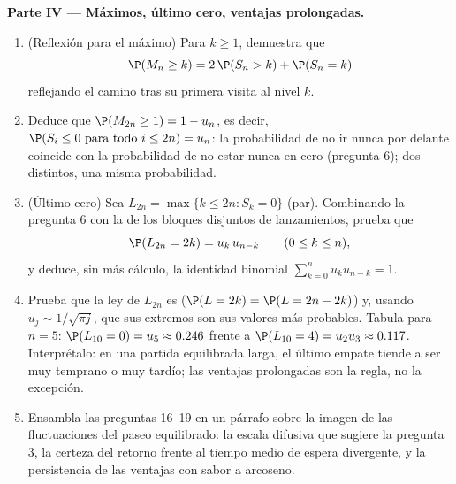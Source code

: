 \begin{problem}
\medskip
\noindent\textbf{Parte IV --- Máximos, último cero, ventajas
prolongadas.}
\begin{enumerate}[resume]
  \item (Reflexión para el máximo) Para $k \geq 1$, demuestra que
        \[
        \P(M_n \geq k) = 2\,\P(S_n > k) + \P(S_n = k)
        \]
        reflejando el camino tras su primera visita al nivel $k$.
  \item Deduce que $\P(M_{2n} \geq 1) = 1 - u_n$, es decir, $\P(S_i
        \leq 0 \text{ para todo } i \leq 2n) = u_n$: la probabilidad
        de no ir nunca por delante coincide con la probabilidad de
        no estar nunca en cero (pregunta 6); dos  distintos,
        una misma probabilidad.
  \item (Último cero) Sea $L_{2n} = \max\{k \leq 2n : S_k = 0\}$
        (par). Combinando la pregunta 6 con la  de los
        bloques disjuntos de lanzamientos, prueba que
        \[
        \P(L_{2n} = 2k) = u_k\,u_{n-k}
        \qquad (0 \leq k \leq n),
        \]
        y deduce, sin más cálculo, la identidad binomial
        $\sum_{k=0}^n u_ku_{n-k} = 1$.
  \item Prueba que la ley de $L_{2n}$ es  ($\P(L = 2k) =
        \P(L = 2n - 2k)$) y, usando $u_j \sim 1/\sqrt{\pi j}$, que
        sus extremos son sus valores más probables. Tabula para $n =
        5$: $\P(L_{10} = 0) = u_5 \approx 0.246$ frente a
        $\P(L_{10} = 4) = u_2u_3 \approx 0.117$. Interprétalo: en
        una partida equilibrada larga, el último empate tiende a ser
        muy temprano o muy tardío; las ventajas prolongadas son la
        regla, no la excepción.
  \item Ensambla las preguntas 16--19 en un párrafo sobre la imagen
        de las fluctuaciones del paseo equilibrado: la escala
        difusiva que sugiere la pregunta 3, la certeza del retorno
        frente al tiempo medio de espera divergente, y la
        persistencia de las ventajas con sabor a arcoseno.
\end{enumerate}


\end{problem}
